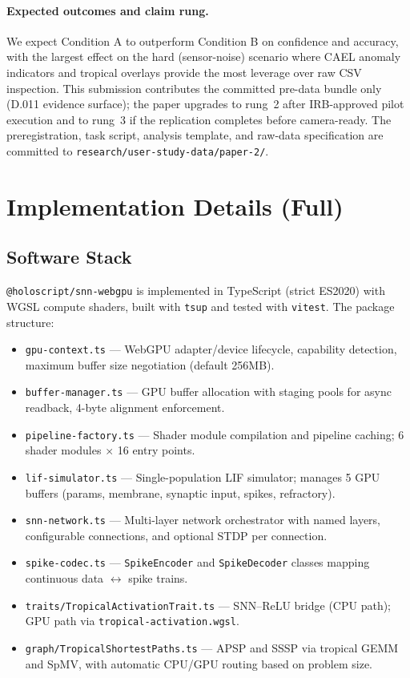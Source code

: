 \documentclass[10pt]{article}
\makeatletter
\newcommand{\snnwebgpu}{\texttt{@holoscript/snn-webgpu}}
\makeatother
\begin{document}
\paragraph{Expected outcomes and claim rung.}
We expect Condition A to outperform Condition B on confidence and
accuracy, with the largest effect on the hard (sensor-noise) scenario
where CAEL anomaly indicators and tropical overlays provide the most
leverage over raw CSV inspection.  This submission contributes the
committed pre-data bundle only (D.011 evidence surface); the paper
upgrades to rung~2 after IRB-approved pilot execution and to rung~3
if the replication completes before camera-ready.  The preregistration,
task script, analysis template, and raw-data specification are committed
to \texttt{research/user-study-data/paper-2/}.

\section{Implementation Details (Full)}
\label{supp:implementation}

\subsection{Software Stack}

\snnwebgpu{} is implemented in TypeScript (strict ES2020) with WGSL compute
shaders, built with \texttt{tsup} and tested with \texttt{vitest}.
The package structure:

\begin{itemize}
\item \texttt{gpu-context.ts} --- WebGPU adapter/device lifecycle, capability detection,
  maximum buffer size negotiation (default 256MB).
\item \texttt{buffer-manager.ts} --- GPU buffer allocation with staging pools for
  async readback, 4-byte alignment enforcement.
\item \texttt{pipeline-factory.ts} --- Shader module compilation and pipeline caching;
  6 shader modules $\times$ 16 entry points.
\item \texttt{lif-simulator.ts} --- Single-population LIF simulator; manages
  5 GPU buffers (params, membrane, synaptic input, spikes, refractory).
\item \texttt{snn-network.ts} --- Multi-layer network orchestrator with named layers,
  configurable connections, and optional STDP per connection.
\item \texttt{spike-codec.ts} --- \texttt{SpikeEncoder} and \texttt{SpikeDecoder}
  classes mapping continuous data $\leftrightarrow$ spike trains.
\item \texttt{traits/TropicalActivationTrait.ts} --- SNN--ReLU bridge (CPU path);
  GPU path via \texttt{tropical-activation.wgsl}.
\item \texttt{graph/TropicalShortestPaths.ts} --- APSP and SSSP via tropical
  GEMM and SpMV, with automatic CPU/GPU routing based on problem size.
\end{itemize}
\end{document}
